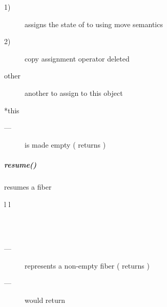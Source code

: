 \effects
\begin{description}
    \item[1)] assigns the state of  to  using move semantics
    \item[2)] copy assignment operator deleted
\end{description}

\params
\begin{description}
    \item[other]   another \fiber to assign to this object
\end{description}

\returns
\begin{description}
    \item[*this]
\end{description}

\postcond
\begin{description}
    \item[---]  is made empty ( returns )
\end{description}


\subparagraph*{resume()}
resumes a fiber

\begin{tabular}{ l l }
    \midrule

    \\
    \\

    \midrule
\end{tabular}

\requires
\begin{description}
    \item[---]  represents a non-empty fiber ( returns )
    \item[---] \canxtresume would return 
\end{description}

